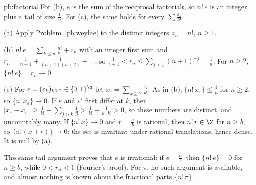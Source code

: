 \begin{solution}{pb:factorial}
\idea For (b), $e$ is the sum of the reciprocal factorials, so $n!\,e$ is an integer plus a tail of size $\frac1n$. For (c), the same holds for every
$\sum\frac{\varepsilon_k}{k!}$.

\writeup (a) Apply Problem~\ref{pb:weylae} to the distinct integers $a_n=n!$, $n\ge1$.

(b) $n!\,e=\sum_{k\le n}\frac{n!}{k!}+r_n$ with an integer first sum and $r_n=\frac1{n+1}+\frac1{(n+1)(n+2)}+\dots$, so $\frac1{n+1}<r_n\le\sum_{j\ge1}(n+1)^{-j}=\frac1n$. For
$n\ge2$, $\{n!\,e\}=r_n\to0$.

(c) For $\varepsilon=(\varepsilon_k)_{k\ge2}\in\{0,1\}^{\N}$ let $x_\varepsilon=\sum_{k\ge2}\frac{\varepsilon_k}{k!}$. As in (b), $\{n!\,x_\varepsilon\}\le\frac1n$ for $n\ge2$, so
$\{n!\,x_\varepsilon\}\to0$. If $\varepsilon$ and $\varepsilon'$ first differ at $k$, then $|x_\varepsilon-x_{\varepsilon'}|\ge\frac1{k!}-\sum_{j>k}\frac1{j!}>\frac1{k!}-\frac1{k\cdot k!}>0$,
so these numbers are distinct, and uncountably many. If $\{n!\,x\}\to0$ and $r=\frac ab$ is rational, then $n!\,r\in\Z$ for $n\ge b$, so $\{n!(x+r)\}\to0$: the set is
invariant under rational translations, hence dense. It is null by (a).

\leads The same tail argument proves that $e$ is irrational: if $e=\frac ab$, then $\{n!\,e\}=0$ for $n\ge b$, while $0<r_n<1$ (Fourier's proof). For $\pi$, no such
argument is available, and almost nothing is known about the fractional parts $\{n!\,\pi\}$.
\end{solution}

